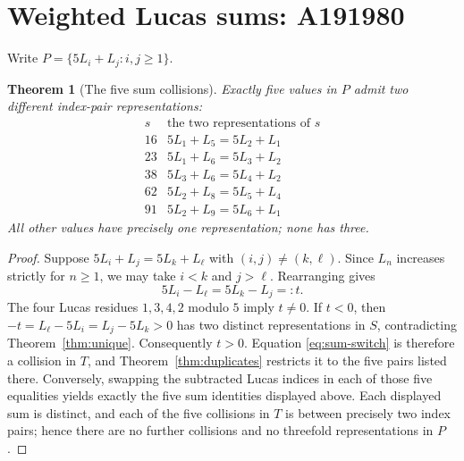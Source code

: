 \documentclass[11pt]{article}
\newtheorem{theorem}{Theorem}
\begin{document}
\section*{Weighted Lucas sums: A191980}
Write $P=\{5L_i+L_j:i,j\ge1\}$.
\begin{theorem}[The five sum collisions]\label{thm:sums}
Exactly five values in $P$ admit two different index-pair
representations:
\[
\begin{array}{c|l}
s&\text{the two representations of }s\\ \hline
16&5L_1+L_5=5L_2+L_1\\
23&5L_1+L_6=5L_3+L_2\\
38&5L_3+L_6=5L_4+L_2\\
62&5L_2+L_8=5L_5+L_4\\
91&5L_2+L_9=5L_6+L_1
\end{array}
\]
All other values have precisely one representation; none has three.
\end{theorem}
\begin{proof}
Suppose $5L_i+L_j=5L_k+L_\ell$ with $(i,j)\ne(k,\ell)$.
Since $L_n$ increases strictly for $n\ge1$, we may take
$i<k$ and $j>\ell$. Rearranging gives
\begin{equation}\label{eq:sum-switch}
5L_i-L_\ell=5L_k-L_j=:t.
\end{equation}
The four Lucas residues $1,3,4,2$ modulo $5$ imply
$t\ne0$. If $t<0$, then
$-t=L_\ell-5L_i=L_j-5L_k>0$
has two distinct representations in $S$, contradicting
Theorem~\ref{thm:unique}. Consequently $t>0$.
Equation \eqref{eq:sum-switch} is therefore a collision
in $T$, and Theorem~\ref{thm:duplicates} restricts it to
the five pairs listed there.
Conversely, swapping the subtracted Lucas indices in
each of those five equalities yields exactly the five
sum identities displayed above. Each displayed sum is distinct,
and each of the five collisions in $T$ is between precisely
two index pairs; hence there are no further collisions and
no threefold representations in $P$.
\end{proof}
\end{document}
